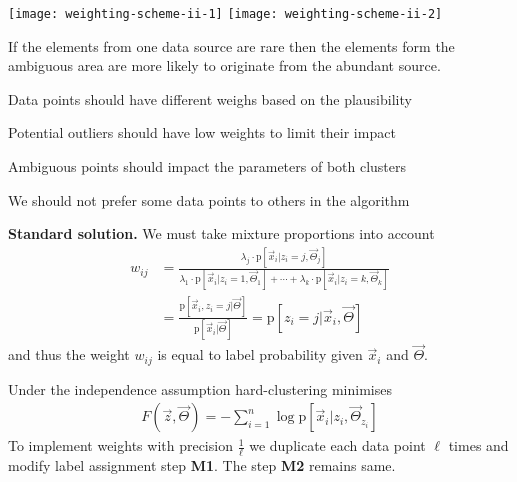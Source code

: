\documentclass[landscape,footrule]{foils}
\newcommand{\pd}[1]{\mathrm{p}[#1]}
\begin{document}
\begin{center}
\texttt{[image: weighting-scheme-ii-1]}\hspace*{-2cm}
\texttt{[image: weighting-scheme-ii-2]}
\end{center}
\vspace*{-2cm}

If the elements from one data source are rare then the elements form the ambiguous area are more likely to originate from the abundant source.
\vspace*{-1cm}  



Data points should have different weighs based on the plausibility 
\begin{triangles}
\item Potential outliers should have low weights to limit their impact
\item Ambiguous points should impact the parameters of both clusters 
\item We should not prefer some data points to others in the algorithm
\end{triangles} 
\vspace*{1cm}

\textbf{Standard solution.}
We must take mixture proportions into account
\begin{align*}
w_{ij}&=\frac{\lambda_j\cdot\pd{\vec{x}_i|z_i=j,\vec{\Theta}_j}}{\lambda_1\cdot\pd{\vec{x}_i|z_i=1,\vec{\Theta}_1}+\cdots+\lambda_k\cdot\pd{\vec{x}_i|z_i=k,\vec{\Theta}_k}}\\
  &=\frac{\pd{\vec{x}_i,z_i=j|\vec{\Theta}}}{\pd{\vec{x}_i|\vec{\Theta}}}
  =\pd{z_i=j|\vec{x}_i,\vec{\Theta}}
\end{align*}
and thus the weight $w_{ij}$ is equal to label probability given $\vec{x}_i$ and $\vec{\Theta}$.\vspace*{-0.5cm}



Under the independence assumption hard-clustering minimises 
\begin{align*}
F(\vec{z},\vec{\Theta}) =- \sum_{i=1}^n \log\pd{\vec{x}_i|z_i,\vec{\Theta}_{z_i}}
\end{align*}
To implement weights with precision $\frac{1}{\ell}$ we duplicate each data point $\ell$ times and modify label assignment step \textbf{M1}. The step \textbf{M2} remains same.  
\vspace*{1cm}
\end{document}
